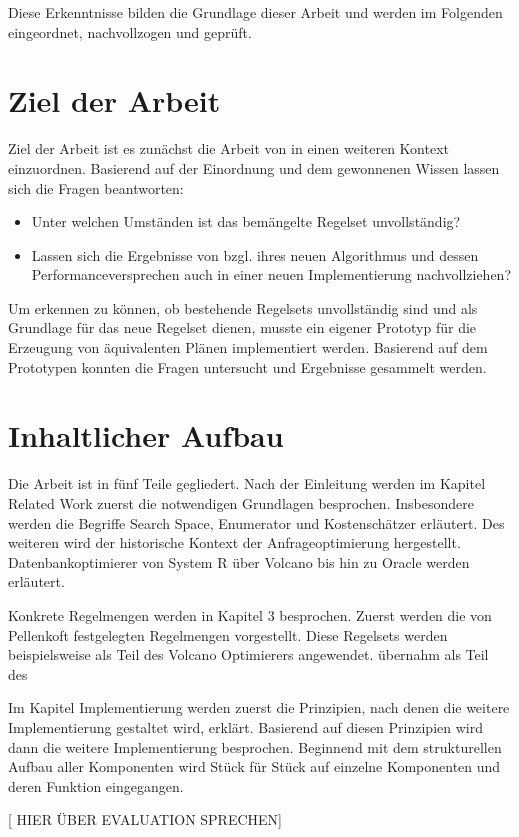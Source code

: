 Diese Erkenntnisse bilden die Grundlage dieser Arbeit und werden im Folgenden eingeordnet, nachvollzogen und geprüft.

\section{Ziel der Arbeit}

Ziel der Arbeit ist es zunächst die Arbeit von \cite{shanbhag2014optimizing} in einen weiteren Kontext einzuordnen. Basierend auf der Einordnung und dem gewonnenen Wissen lassen sich die Fragen beantworten:

\begin{itemize}
\item Unter welchen Umständen ist das bemängelte Regelset unvollständig? 
\item Lassen sich die Ergebnisse von \cite{shanbhag2014optimizing} bzgl. ihres neuen Algorithmus und dessen Performanceversprechen auch in einer neuen Implementierung nachvollziehen?
\end{itemize}

Um erkennen zu können, ob bestehende Regelsets unvollständig sind und als Grundlage für das neue Regelset dienen,  musste ein eigener Prototyp für die Erzeugung von äquivalenten Plänen implementiert werden. Basierend auf dem Prototypen konnten die Fragen untersucht und Ergebnisse gesammelt werden.







\section{Inhaltlicher Aufbau}
Die Arbeit ist in fünf Teile gegliedert. Nach der Einleitung werden im Kapitel Related Work zuerst die notwendigen Grundlagen besprochen. Insbesondere werden die Begriffe Search Space, Enumerator und Kostenschätzer erläutert. Des weiteren wird der historische Kontext der Anfrageoptimierung hergestellt. Datenbankoptimierer von System R über Volcano bis hin zu Oracle werden erläutert. 

Konkrete Regelmengen werden in Kapitel 3 besprochen. Zuerst werden die von Pellenkoft festgelegten Regelmengen vorgestellt. Diese Regelsets werden beispielsweise als Teil des Volcano Optimierers angewendet. \cite{shanbhag2014optimizing} übernahm als Teil des 

Im Kapitel Implementierung werden zuerst die Prinzipien,  nach denen die weitere Implementierung gestaltet wird, erklärt. Basierend auf diesen Prinzipien wird dann die weitere Implementierung besprochen. Beginnend mit dem strukturellen Aufbau aller Komponenten wird Stück für Stück auf einzelne Komponenten und deren Funktion eingegangen.

[ HIER ÜBER EVALUATION SPRECHEN]



 